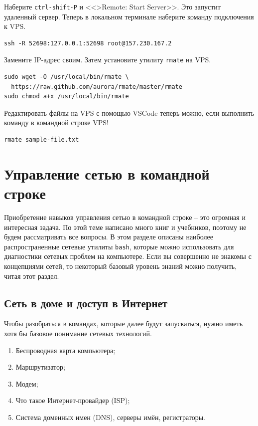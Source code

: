 \documentclass[a4paper,12pt,final,openany]{extbook}
\providecommand{\tightlist}{%
  \setlength{\itemsep}{0pt}\setlength{\parskip}{0pt}}
\begin{document}
Наберите \texttt{ctrl-shift-P} и <<\textgreater Remote: Start Server>>. Это
запустит удаленный сервер. Теперь в локальном терминале наберите команду
подключения к VPS.
\begin{verbatim}
ssh -R 52698:127.0.0.1:52698 root@157.230.167.2
\end{verbatim}

Замените IP-адрес своим. Затем установите утилиту \texttt{rmate} на VPS.
\begin{verbatim}
sudo wget -O /usr/local/bin/rmate \
  https://raw.github.com/aurora/rmate/master/rmate
sudo chmod a+x /usr/local/bin/rmate
\end{verbatim}

Редактировать файлы на VPS с помощью VSCode теперь можно, если выполнить
команду в командной строке VPS!
\begin{verbatim}
rmate sample-file.txt
\end{verbatim}

\hypertarget{Networking-on-Command-Line}{%
\section{\texorpdfstring{\protect\hyperlink{Networking-on-Command-Line}{}Управление
сетью в командной
строке}{Управление сетью в командной строке}}\label{Networking-on-Command-Line}}

Приобретение навыков управления сетью в командной строке -- это огромная
и интересная задача. По этой теме написано много книг и учебников,
поэтому не будем рассматривать все вопросы. В этом разделе описаны
наиболее распространенные сетевые утилиты \texttt{bash}, которые можно
использовать для диагностики сетевых проблем на компьютере. Если вы
совершенно не знакомы с концепциями сетей, то некоторый базовый уровень
знаний можно получить, читая этот раздел.

\hypertarget{Your-home-network-and-the-internet}{%
\subsection{\texorpdfstring{\protect\hyperlink{Your-home-network-and-the-internet}{}Сеть
в доме и доступ в
Интернет}{Сеть в доме и доступ в Интернет}}\label{Your-home-network-and-the-internet}}

Чтобы разобраться в командах, которые далее будут запускаться, нужно
иметь хотя бы базовое понимание сетевых технологий.
\begin{enumerate}
\tightlist
\item
  Беспроводная карта компьютера;
\item
  Маршрутизатор;
\item
  Модем;
\item
  Что такое Интернет-провайдер (ISP);
\item
  Система доменных имен (DNS), серверы имён, регистраторы.
\end{enumerate}
\end{document}
